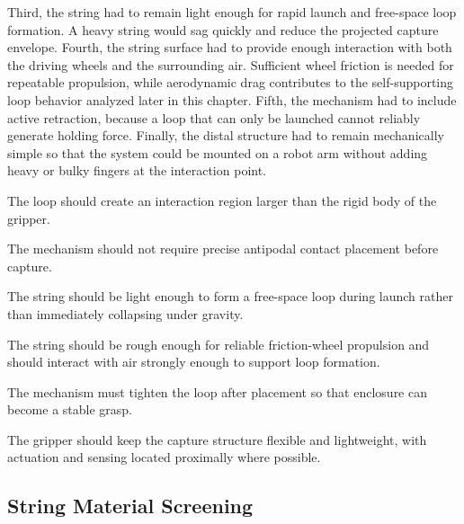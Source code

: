Third, the string had to remain light enough for rapid launch and free-space loop formation. A heavy string would sag quickly and reduce the projected capture envelope. Fourth, the string surface had to provide enough interaction with both the driving wheels and the surrounding air. Sufficient wheel friction is needed for repeatable propulsion, while aerodynamic drag contributes to the self-supporting loop behavior analyzed later in this chapter. Fifth, the mechanism had to include active retraction, because a loop that can only be launched cannot reliably generate holding force. Finally, the distal structure had to remain mechanically simple so that the system could be mounted on a robot arm without adding heavy or bulky fingers at the interaction point.

\begin{description}[style=standard, leftmargin=1.5em, labelindent=0pt, itemsep=0.6em]
    \item[\textbf{Large capture envelope:}] The loop should create an interaction region larger than the rigid body of the gripper.

    \item[\textbf{Tolerance to pose uncertainty:}] The mechanism should not require precise antipodal contact placement before capture.

    \item[\textbf{Low string mass:}] The string should be light enough to form a free-space loop during launch rather than immediately collapsing under gravity.

    \item[\textbf{Sufficient friction and aerodynamic interaction:}] The string should be rough enough for reliable friction-wheel propulsion and should interact with air strongly enough to support loop formation.

    \item[\textbf{Active retraction:}] The mechanism must tighten the loop after placement so that enclosure can become a stable grasp.

    \item[\textbf{Low distal complexity:}] The gripper should keep the capture structure flexible and lightweight, with actuation and sensing located proximally where possible.
\end{description}

\subsection{String Material Screening}

